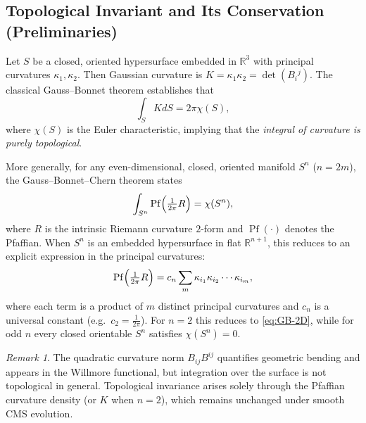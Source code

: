 \documentclass[11pt]{article}
\theoremstyle{definition}
\theoremstyle{plain}
\theoremstyle{remark}
\newtheorem{remark}[definition]{Remark}
\begin{document}

\subsection{Topological Invariant and Its Conservation (Preliminaries)}

Let $S$ be a closed, oriented hypersurface embedded in $\mathbb{R}^{3}$ with principal curvatures $\kappa_1,\kappa_2$.  
Then Gaussian curvature is $K=\kappa_1\kappa_2=\det(B_i{}^{j})$.  
The classical Gauss--Bonnet theorem establishes that
\begin{equation}
\label{eq:GB-2D}
\int_{S} K dS = 2\pi \chi(S),
\end{equation}
where $\chi(S)$ is the Euler characteristic, implying that the \emph{integral of curvature is purely topological}.

More generally, for any even-dimensional, closed, oriented manifold $S^n$ ($n=2m$), the Gauss--Bonnet--Chern theorem states
\begin{equation}
\label{eq:GBC}
\int_{S^n} \operatorname{Pf} \Bigl(\tfrac{1}{2\pi} R\Bigr) = \chi(S^n),
\end{equation}
where $R$ is the intrinsic Riemann curvature $2$-form and $\operatorname{Pf}(\cdot)$ denotes the Pfaffian.  
When $S^n$ is an embedded hypersurface in flat $\mathbb{R}^{n+1}$, this reduces to an explicit expression in the principal curvatures:
\begin{equation}
\label{eq:Pf-principal}
\operatorname{Pf} \Bigl(\tfrac{1}{2\pi}R\Bigr)
= c_n
\sum_m \kappa_{i_1}\kappa_{i_2}\cdots\kappa_{i_m},
\end{equation}
where each term is a product of $m$ distinct principal curvatures and $c_n$ is a universal constant (e.g.\ $c_2=\tfrac{1}{2\pi}$).  
For $n=2$ this reduces to \eqref{eq:GB-2D}, while for odd $n$ every closed orientable $S^n$ satisfies $\chi(S^n)=0$.

\begin{remark}
The quadratic curvature norm $B_{ij}B^{ij}$ quantifies geometric bending and appears in the Willmore functional, but integration over the surface is not topological in general.   
Topological invariance arises solely through the Pfaffian curvature density (or $K$ when $n=2$), which remains unchanged under smooth CMS evolution.
\end{remark}
\end{document}
